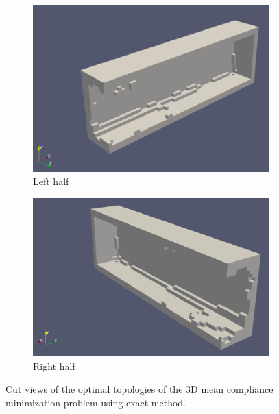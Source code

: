     \begin{figure}
      \begin{subfigure}[t]{0.45\textwidth}
        \centering
        \includegraphics[width=1\textwidth]{./images/robust_approx/exact_mean_1.png}
        \caption{Left half}
      \end{subfigure} \hfill
      \begin{subfigure}[t]{0.45\textwidth}
        \centering
        \includegraphics[width=1\textwidth]{./images/robust_approx/exact_mean_2.png}
        \caption{Right half}
      \end{subfigure}
      \caption{Cut views of the optimal topologies of the 3D mean compliance minimization problem using exact method.}
      \label{fig:exact_mean_3d}
    \end{figure}

